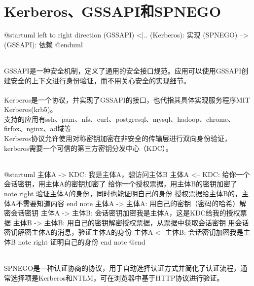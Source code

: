 \documentclass[a4paper]{scrartcl}
\begin{document}
\tableofcontents
\clearpage
\section{Kerberos、GSSAPI和SPNEGO}
\begin{plantuml}
    @startuml
    left to right direction
    (GSSAPI) <|.. (Kerberos): 实现
    (SPNEGO) --> (GSSAPI): 依赖
    @enduml
\end{plantuml}
\\
GSSAPI是一种安全机制，定义了通用的安全接口规范。应用可以使用GSSAPI创建安全的上下文进行身份验证，而不用关心安全的实现细节。
\\
\\
Kerberos是一个协议，并实现了GSSAPI的接口，也代指其具体实现服务程序MIT Kerberos(krb5)。
\\
支持的应用有ssh、pam、nfs、curl、postgresql、mysql、hadoop、chrome、firfox、nginx、ad域等
\\
Kerberos协议允许使用对称密钥加密在非安全的传输层进行双向身份验证，kerberos需要一个可信的第三方密钥分发中心（KDC）。
\\\\
\begin{plantuml}
@startuml
主体A -> KDC: 我是主体A，想访问主体B
主体A <-- KDC: 给你一个会话密钥，用主体A的密钥加密了 \n 给你一个授权票据，用主体B的密钥加密了
note right
验证主体A的身份，同时也能证明自己的身份
授权票据给主体B的，主体A不需要知道内容
end note
主体A -> 主体A: 用自己的密钥（密码的哈希）解密会话密钥
主体A -> 主体B: 会话密钥加密{我是主体A}，这是KDC给我的授权票据
主体B -> 主体B: 用自己的密钥解密授权票据，从票据中获取会话密钥 \n 用会话密钥解密主体A的消息，验证主体A的身份
主体A <- 主体B: 会话密钥加密{我是主体B}
note right
证明自己的身份
end note
@end
\end{plantuml}
\\
SPNEGO是一种认证协商的协议，用于自动选择认证方式并简化了认证流程，通常选择项是Kerberos和NTLM，可在浏览器中基于HTTP协议进行验证。
\clearpage
\end{document}
